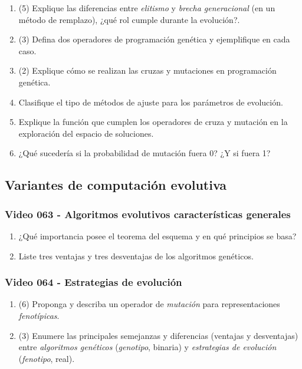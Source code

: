 \documentclass[a4paper,10pt,spanish]{article}
\begin{document}
\begin{enumerate}
\item (5) Explique las diferencias entre \textit{elitismo} y \textit{brecha generacional} (en un método de remplazo), ¿qué rol cumple durante la evolución?.

\item (3) Defina dos operadores de programación genética y ejemplifique en cada caso.

\item (2) Explique cómo se realizan las cruzas y mutaciones en programación genética.

\item Clasifique el tipo de métodos de ajuste para los parámetros de evolución.

\item Explique la función que cumplen los operadores de cruza y mutación en la exploración del espacio de soluciones.

\item ¿Qué sucedería si la probabilidad de mutación fuera 0? ¿Y si fuera 1? 
\end{enumerate}

\subsection{Variantes de computación evolutiva}

\subsubsection{Video 063 - Algoritmos evolutivos características generales}

\begin{enumerate}
\item ¿Qué importancia posee el teorema del esquema y en qué principios se basa?

\item Liste tres ventajas y tres desventajas de los algoritmos genéticos.
\end{enumerate}

\subsubsection{Video 064 - Estrategias de evolución}

\begin{enumerate}
\item (6) Proponga y describa un operador de \textit{mutación} para representaciones \textit{fenotípicas}.

\item (3) Enumere las principales semejanzas y diferencias (ventajas y desventajas) entre \textit{algoritmos genéticos} (\textit{genotipo}, binaria) y \textit{estrategias de evolución} (\textit{fenotipo}, real).
\end{enumerate}
\end{document}
